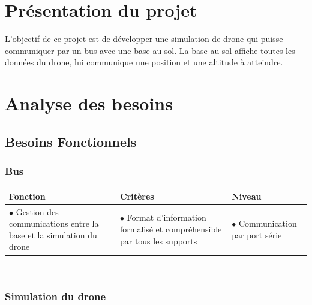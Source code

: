 \documentclass[12pt,a4paper]{article}
\begin{document}
\tableofcontents
\newpage
\section{Présentation du projet}
L'objectif de ce projet est de développer une simulation de drone qui puisse communiquer par un bus avec une base au sol. La base au sol affiche toutes les données du drone, lui communique une position et une altitude à atteindre.

\section{Analyse des besoins}
\subsection{Besoins Fonctionnels }

\subsubsection{Bus}


\begin{tabular}{|p{6cm}|p{5cm}|p{5cm}|}
	\hline
       Fonction  & Critères  & Niveau\\
    \hline
		$\bullet$ Gestion des communications entre la base et la simulation du drone & $\bullet$ Format d'information formalisé et compréhensible par tous les supports  & $\bullet$ Communication par port série\\
    \hline	
\end{tabular}\\


\subsubsection{Simulation du drone}
\end{document}
